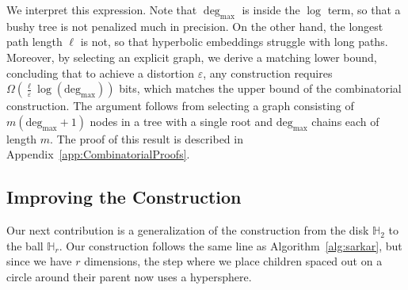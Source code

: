 We interpret this expression. Note that $\operatorname{deg}_{\max}$ is inside the $\log$ term, so that a bushy tree is not penalized much in precision. On the other hand, the longest path length $\ell$ is not, so that hyperbolic embeddings struggle with long paths. 
Moreover, by selecting an explicit graph, we derive a matching lower
bound, concluding that to achieve a distortion $\varepsilon$, any
construction requires $\Omega\left(\frac{\ell}{\varepsilon} \log (\text{deg}_{\max}) \right)$
bits, which matches the upper bound of the combinatorial
construction. The argument follows from selecting a graph consisting
of $m(\text{deg}_{\max}+1)$ nodes in a tree with a single root and $\text{deg}_{\max}$ chains each of length $m$. The
proof of this result is described in Appendix~\ref{app:CombinatorialProofs}.



\subsection{Improving the Construction}




Our next contribution is a generalization of the construction from the disk $\mathbb{H}_2$ to the ball $\mathbb{H}_r$. Our construction follows the same line as Algorithm~\ref{alg:sarkar}, but since we have $r$ dimensions, the step where we place children spaced out on a circle around their parent now uses a hypersphere.

